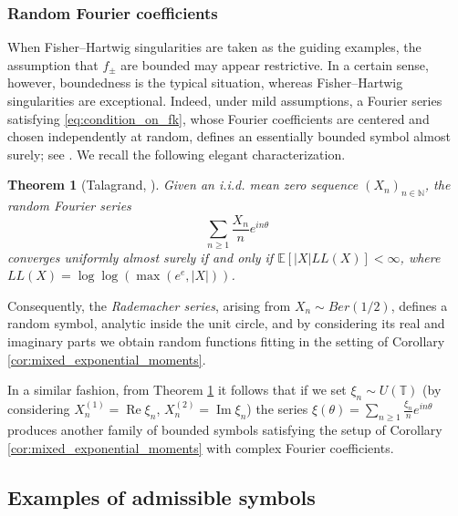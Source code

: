 \documentclass[11pt]{amsart}
\theoremstyle{plain}
\newtheorem{theorem}{Theorem}[section]
\theoremstyle{remark}
\renewcommand{\Re}{\mathop{\mathrm{Re}}}
\renewcommand{\Im}{\mathop{\mathrm{Im}}}
\numberwithin{equation}{section}
\begin{document}
\subsubsection{Random Fourier coefficients}
When Fisher--Hartwig singularities are taken as the guiding examples, the assumption that $f_{\pm}$  are bounded may appear restrictive. In a certain sense, however, boundedness is the typical situation, whereas Fisher--Hartwig singularities are exceptional. Indeed, under mild assumptions, a Fourier series satisfying \eqref{eq:condition_on_fk}, whose Fourier coefficients are centered and chosen independently at random, defines an essentially bounded symbol almost surely; see \cite{Tal}. We recall the following elegant characterization.
\begin{theorem}[Talagrand, \cite{Tal}]\label{theorem:talagrand}
Given an i.i.d. mean zero
sequence 
$(X_n)_{n\in\mathbb{N}}$,
the random Fourier series
$$
\sum_{n\geq 1}\frac{X_n}{n}e^{in\theta}
$$
converges uniformly almost surely if and only if $\mathbb{E}[|X|LL(X)]<\infty$, where $LL(X)=\log\log(\max(e^e, |X|))$.
\end{theorem}
%
%
%
Consequently, the \textit{Rademacher series}, arising from $X_n\sim Ber(1/2)$, defines a random symbol, analytic inside the unit circle, and by considering its real and imaginary parts we obtain random functions fitting in the setting of Corollary \ref{cor:mixed_exponential_moments}. 

In a similar fashion, from Theorem \ref{theorem:talagrand} it follows that if we set $\xi_n\sim U(\mathbb{T})$ (by considering $X_n^{(1)}=\Re \xi_n$, $X_n^{(2)}= \Im \xi_n$) the series $\xi(\theta)=\sum_{n\geq 1}\frac{\xi_n}{n}e^{in\theta}$ produces another family of bounded symbols satisfying the setup of Corollary \ref{cor:mixed_exponential_moments} with complex Fourier coefficients. 

\subsection{Examples of admissible symbols}
\end{document}
